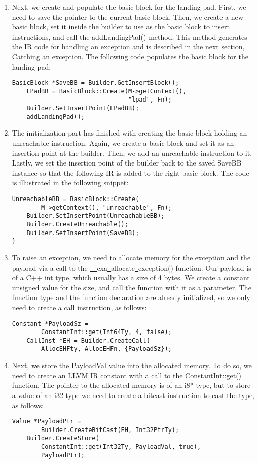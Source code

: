 \begin{enumerate}
\item Next, we create and populate the basic block for the landing pad. First, we need to save the pointer to the current basic block. Then, we create a new basic block, set it inside the builder to use as the basic block to insert instructions, and call the addLandingPad() method. This method generates the IR code for handling an exception and is described in the next section, Catching an exception. The following code populates the basic block for the landing pad:
\begin{lstlisting}[caption={}]
	BasicBlock *SaveBB = Builder.GetInsertBlock();
	LPadBB = BasicBlock::Create(M->getContext(),
								"lpad", Fn);
	Builder.SetInsertPoint(LPadBB);
	addLandingPad();
\end{lstlisting}

\item The initialization part has finished with creating the basic block holding an unreachable instruction. Again, we create a basic block and set it as an insertion point at the builder. Then, we add an unreachable instruction to it. Lastly, we set the insertion point of the builder back to the saved SaveBB instance so that the following IR is added to the right basic block. The code is illustrated in the following snippet:
\begin{lstlisting}[caption={}]
	UnreachableBB = BasicBlock::Create(
		M->getContext(), "unreachable", Fn);
	Builder.SetInsertPoint(UnreachableBB);
	Builder.CreateUnreachable();
	Builder.SetInsertPoint(SaveBB);
}
\end{lstlisting}

\item To raise an exception, we need to allocate memory for the exception and the payload via a call to the \underline{~~}cxa\underline{~}allocate\underline{~}exception() function. Our payload is of a C++ int type, which usually has a size of 4 bytes. We create a constant unsigned value for the size, and call the function with it as a parameter. The function type and the function declaration are already initialized, so we only need to create a call instruction, as follows:
\begin{lstlisting}[caption={}]
	Constant *PayloadSz =
		ConstantInt::get(Int64Ty, 4, false);
	CallInst *EH = Builder.CreateCall(
		AllocEHFty, AllocEHFn, {PayloadSz});
\end{lstlisting}

\item Next, we store the PayloadVal value into the allocated memory. To do so, we need to create an LLVM IR constant with a call to the ConstantInt::get() function. The pointer to the allocated memory is of an i8* type, but to store a value of an i32 type we need to create a bitcast instruction to cast the type, as follows:
\begin{lstlisting}[caption={}]
	Value *PayloadPtr =
		Builder.CreateBitCast(EH, Int32PtrTy);
	Builder.CreateStore(
		ConstantInt::get(Int32Ty, PayloadVal, true),
		PayloadPtr);
\end{lstlisting}


\end{enumerate}
